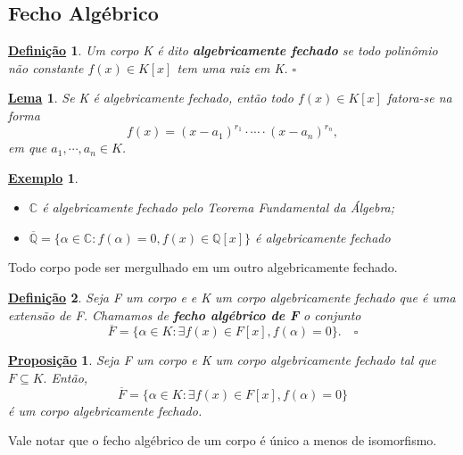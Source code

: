 \documentclass{article}
\newtheorem*{def*}{\underline{Defini\c c\~ao}}
\newtheorem*{lemma*}{\underline{Lema}}
\newtheorem*{prop*}{\underline{Proposi\c c\~ao}}
\newtheorem{example}{\underline{Exemplo}}
\begin{document}
\subsection{Fecho Algébrico}
\begin{def*}
  Um corpo K é dito \textbf{algebricamente fechado} se todo polinômio não constante \(f(x)\in K[x]\) tem
uma raiz em K. \(\square\)
\end{def*}
\begin{lemma*}
  Se K é algebricamente fechado, então todo \(f(x)\in K[x]\) fatora-se na forma 
    \[
      f(x) = (x-a_{1})^{r_{1}}\cdot \cdots \cdot (x-a_{n})^{r_{n}},
    \]
    em que \(a_{1}, \cdots, a_{n}\in K\).
\end{lemma*}
\begin{example}
 \begin{itemize}
   \item[1)] \(\mathbb{C}\) é algebricamente fechado pelo Teorema Fundamental da Álgebra;
   \item[2)] \(\overline{\mathbb{Q}} = \{\alpha \in \mathbb{C}: f(\alpha ) = 0, f(x)\in \mathbb{Q}[x]\}\) é algebricamente fechado
 \end{itemize}
\end{example}
  Todo corpo pode ser mergulhado em um outro algebricamente fechado.
\begin{def*}
  Seja F um corpo e e K um corpo algebricamente fechado que é uma extensão de F. Chamamos de
\textbf{fecho algébrico de F} o conjunto 
  \[
    \overline{F} = \{\alpha \in K: \exists f(x)\in F[x], f(\alpha ) = 0\}.\quad\square
  \]
\end{def*}
\begin{prop*}
  Seja F um corpo e K um corpo algebricamente fechado tal que \(F \subseteq{K}.\) Então, 
  \[
    \overline{F} = \{\alpha \in K: \exists f(x)\in F[x], f(\alpha ) = 0\}
  \]
  é um corpo algebricamente fechado.
\end{prop*}
  Vale notar que o fecho algébrico de um corpo é único a menos de isomorfismo.
\end{document}
